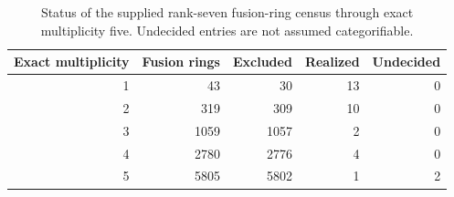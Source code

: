 \begin{table}[H]
\centering
\caption{Status of the supplied rank-seven fusion-ring census through exact multiplicity five. Undecided entries are not assumed categorifiable.}\label{tab:status}
\begin{tabular}{@{}r r r r r@{}}
\toprule
Exact multiplicity & Fusion rings & Excluded & Realized & Undecided\\
\midrule
1 & 43 & 30 & 13 & 0\\
2 & 319 & 309 & 10 & 0\\
3 & 1059 & 1057 & 2 & 0\\
4 & 2780 & 2776 & 4 & 0\\
5 & 5805 & 5802 & 1 & 2\\
\bottomrule
\end{tabular}
\end{table}

